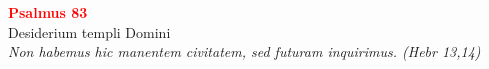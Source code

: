 


\def\greinitialformat#1{%
{\fontsize{39}{39}\selectfont #1}%
}




\vspace{0.3cm}
\begin{center}
 \textcolor{red}{\large \bf Psalmus 83}\\
Desiderium templi Domini\\
\textit{\small Non habemus hic manentem civitatem, sed futuram inquirimus. (Hebr 13,14)}
\end{center}
